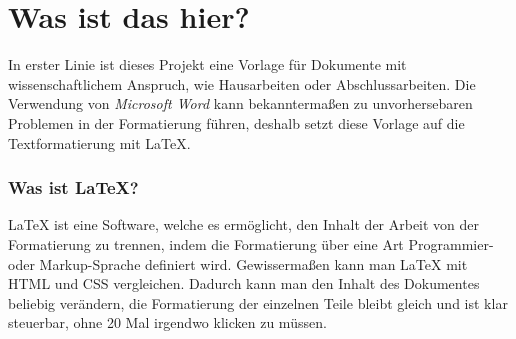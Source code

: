 \documentclass[12pt]{article}
\begin{document}
\renewcommand{\mytitle}{Wissenschaftliches Arbeiten mit LaTeX\\Dokumentation}%
\renewcommand{\myauthor}{Dr. Frank N. Further}%
\renewcommand{\headheight}{27pt}%



\frontmatter%


\printabbreviations%
\clearpage
\renewcommand{\plaintitle}{Abbildungsverzeichnis}
{\def\makebox[#1][#2]#3{#3}%
    \listoffigures
}
\clearpage
\renewcommand{\plaintitle}{Tabellenverzeichnis}
{\def\makebox[#1][#2]#3{#3}%
    \listoftables
}
\clearpage
\renewcommand{\plaintitle}{Inhaltsverzeichnis}%
{\def\makebox[#1][#2]#3{#3}%
    \tableofcontents
}


\clearpage
\mainmatter%

\part{Was ist das hier?}
In erster Linie ist dieses Projekt eine Vorlage für Dokumente mit wissenschaftlichem Anspruch, wie Hausarbeiten oder Abschlussarbeiten. Die Verwendung von \textit{Microsoft Word} kann bekanntermaßen zu unvorhersebaren Problemen in der Formatierung führen, deshalb setzt diese Vorlage auf die Textformatierung mit LaTeX.
\section{Was ist LaTeX?}
LaTeX ist eine Software, welche es ermöglicht, den Inhalt der Arbeit von der Formatierung zu trennen, indem die Formatierung über eine Art Programmier- oder Markup-Sprache definiert wird. Gewissermaßen kann man LaTeX mit HTML und CSS vergleichen. Dadurch kann man den Inhalt des Dokumentes beliebig verändern, die Formatierung der einzelnen Teile bleibt gleich und ist klar steuerbar, ohne 20 Mal irgendwo klicken zu müssen.
\end{document}
